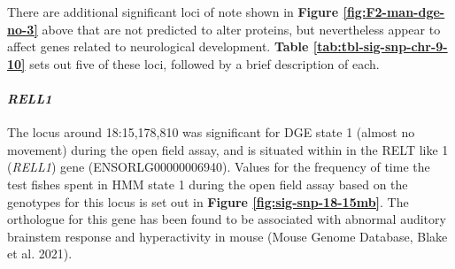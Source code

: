 \documentclass[
]{book}
\begin{document}
There are additional significant loci of note shown in \textbf{Figure \ref{fig:F2-man-dge-no-3}} above that are not predicted to alter proteins, but nevertheless appear to affect genes related to neurological development. \textbf{Table \ref{tab:tbl-sig-snp-chr-9-10}} sets out five of these loci, followed by a brief description of each.

\begin{table}

\caption{\label{tab:tbl-sig-snp-chr-9-10}Notable significant SNPs for direct genetic effects.}
\centering
{}
\end{table}

\hypertarget{rell1}{%
\paragraph{\texorpdfstring{\emph{RELL1}}{RELL1}}\label{rell1}}

The locus around 18:15,178,810 was significant for DGE state 1 (almost no movement) during the open field assay, and is situated within in the RELT like 1 (\emph{RELL1}) gene (ENSORLG00000006940). Values for the frequency of time the test fishes spent in HMM state 1 during the open field assay based on the genotypes for this locus is set out in \textbf{Figure \ref{fig:sig-snp-18-15mb}}. The orthologue for this gene has been found to be associated with abnormal auditory brainstem response and hyperactivity in mouse (Mouse Genome Database, Blake et al. 2021).
\end{document}
